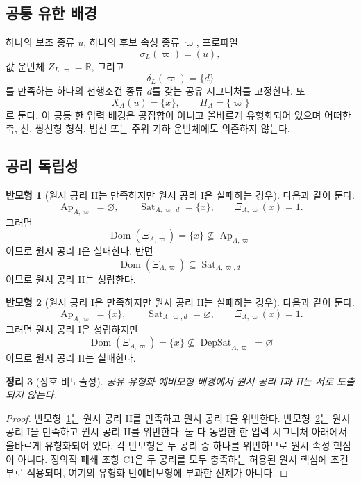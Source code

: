 \documentclass[11pt]{article}
\newcommand{\Ap}{\operatorname{Ap}}
\newcommand{\DepSat}{\operatorname{DepSat}}
\newcommand{\Sat}{\operatorname{Sat}}
\newcommand{\Dom}{\operatorname{Dom}}
\newtheorem{theorem}{정리}[section]
\theoremstyle{definition}
\newtheorem{countermodel}[theorem]{반모형}
\theoremstyle{remark}
\begin{document}
\subsection{공통 유한 배경}

하나의 보조 종류 \(u\), 하나의 후보 속성 종류 \(\varpi\), 프로파일
\[
\sigma_L(\varpi)=(u),
\]
값 운반체 \(Z_{L,\varpi}=\mathbb R\), 그리고
\[
\delta_L(\varpi)=\{d\}
\]
를 만족하는 하나의 선행조건 종류 \(d\)를 갖는 공유 시그니처를 고정한다.
또
\[
X_A(u)=\{x\},
\qquad
\Pi_A=\{\varpi\}
\]
로 둔다.
이 공통 한 입력 배경은 공집합이 아니고 올바르게 유형화되어 있으며 어떠한 축, 선, 쌍선형 형식, 법선 또는 주위 기하 운반체에도 의존하지 않는다.

\subsection{공리 독립성}

\begin{countermodel}[원시 공리 II는 만족하지만 원시 공리 I은 실패하는 경우]
\label{cm:pi}
다음과 같이 둔다.
\[
\Ap_{A,\varpi}=\varnothing,
\qquad
\Sat_{A,\varpi,d}=\{x\},
\qquad
\Xi_{A,\varpi}(x)=1.
\]
그러면
\[
\Dom(\Xi_{A,\varpi})=\{x\}\not\subseteq\Ap_{A,\varpi}
\]
이므로 원시 공리 I은 실패한다. 반면
\[
\Dom(\Xi_{A,\varpi})\subseteq\Sat_{A,\varpi,d}
\]
이므로 원시 공리 II는 성립한다.
\end{countermodel}

\begin{countermodel}[원시 공리 I은 만족하지만 원시 공리 II는 실패하는 경우]
\label{cm:pii}
다음과 같이 둔다.
\[
\Ap_{A,\varpi}=\{x\},
\qquad
\Sat_{A,\varpi,d}=\varnothing,
\qquad
\Xi_{A,\varpi}(x)=1.
\]
그러면 원시 공리 I은 성립하지만
\[
\Dom(\Xi_{A,\varpi})=\{x\}\not\subseteq\DepSat_{A,\varpi}=\varnothing
\]
이므로 원시 공리 II는 실패한다.
\end{countermodel}

\begin{theorem}[상호 비도출성]
\label{thm:independence}
공유 유형화 예비모형 배경에서 원시 공리 I과 II는 서로 도출되지 않는다.
\end{theorem}

\begin{proof}
반모형~\ref{cm:pi}는 원시 공리 II를 만족하고 원시 공리 I을 위반한다.
반모형~\ref{cm:pii}는 원시 공리 I을 만족하고 원시 공리 II를 위반한다.
둘 다 동일한 한 입력 시그니처 아래에서 올바르게 유형화되어 있다.
각 반모형은 두 공리 중 하나를 위반하므로 원시 속성 핵심이 아니다.
정의적 폐쇄 조항 C1은 두 공리를 모두 충족하는 허용된 원시 핵심에 조건부로 적용되며, 여기의 유형화 반예비모형에 부과한 전제가 아니다.
\end{proof}
\end{document}
